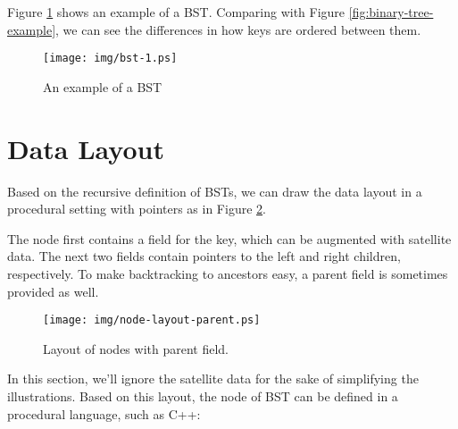 \documentclass{article}
\begin{document}
Figure \ref{fig:bst-example} shows an example of a BST. Comparing with
Figure \ref{fig:binary-tree-example}, we can see the differences in how keys are
ordered between them.

\begin{figure}[htbp]
       \begin{center}
        \texttt{[image: img/bst-1.ps]}
        \caption{An example of a BST} \label{fig:bst-example}
       \end{center}
\end{figure}


\section{Data Layout}

Based on the recursive definition of BSTs, we can draw the
data layout in a procedural setting with pointers as in Figure
\ref{fig:node-layout-parent}.


The node first contains a field for the key, which can be augmented with satellite
data. The next two fields contain pointers to the left and right children, respectively. To make backtracking to ancestors easy, a parent field is sometimes provided as well.

\begin{figure}[htbp]
       \begin{center}
        \texttt{[image: img/node-layout-parent.ps]}
        \caption{Layout of nodes with parent field.} \label{fig:node-layout-parent}
       \end{center}
\end{figure}

In this section, we'll ignore the satellite data for the sake of simplifying the illustrations. Based on this layout, the node of BST can be defined in a procedural language, such as C++:
\end{document}
